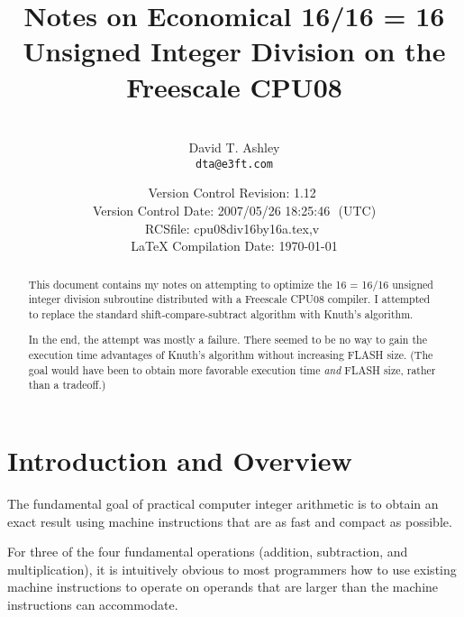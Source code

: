 \documentclass[letterpaper,10pt,titlepage]{article}
\begin{document}
\title{Notes on Economical 16/16 = 16 Unsigned Integer Division on the Freescale CPU08}
\author{\vspace{1cm}\\David T. Ashley\\\texttt{dta@e3ft.com}\\\vspace{1cm}}
\date{\vspace*{8mm}\small{Version Control $ $Revision: 1.12 $ $ \\
      Version Control $ $Date: 2007/05/26 18:25:46 $ $ (UTC) \\
      $ $RCSfile: cpu08div16by16a.tex,v $ $ \\
      \LaTeX{} Compilation Date: \today{}}}
\maketitle

%
\begin{abstract}
This document contains my notes on attempting to optimize
the 16 = 16/16 unsigned integer division subroutine distributed with
a Freescale CPU08 compiler.  I attempted to replace the standard
shift-compare-subtract algorithm with Knuth's algorithm.

In the end, the attempt was mostly a failure.  There seemed to be no way
to gain the execution time advantages of Knuth's algorithm without increasing
FLASH size.  (The goal would have been to obtain more favorable 
execution time \emph{and} FLASH size, rather than a tradeoff.)
\end{abstract}


\section{Introduction and Overview}
\label{siov0}

The fundamental goal of practical computer integer arithmetic is to obtain
an exact result using machine instructions that are as fast and compact as 
possible.

For three of the four fundamental operations (addition, subtraction, and
multiplication), it is intuitively obvious to most programmers how to 
use existing machine instructions to operate on operands that are larger
than the machine instructions can accommodate.
\end{document}
